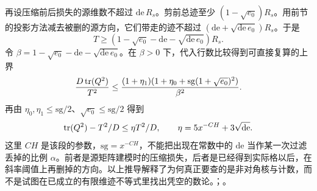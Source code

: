 再设压缩前后损失的源维数不超过 $\mathrm{de}\,R_s$。剪前总迹至少 $(1-\sqrt{e_0})R_s$。用前节的投影方法减去被删的源方向，它们带走的迹不超过 $(\mathrm{de}+\sqrt{\mathrm{de}\,e_0})R_s$。于是
\[
   T\ge(1-\sqrt{e_0}-\mathrm{de}
                   -\sqrt{\mathrm{de}\,e_0})R_s.
\]
令 $\beta=1-\sqrt{e_0}-\mathrm{de}-\sqrt{\mathrm{de}\,e_0}$。在 $\beta>0$ 下，代入行数比较得到可直接复算的上界
\[
 \frac{D\operatorname{tr}(Q^2)}{T^2}
 \le\frac{(1+\eta_1)
       (1+\eta_0+\mathrm{sg}(1+\sqrt{e_0})^2)}{\beta^2}.
\]
再由 $\eta_0,\eta_1\le\mathrm{sg}/2$、$\sqrt{e_0}\le\mathrm{sg}/2$ 得到
\[
 \operatorname{tr}(Q^2)-T^2/D\le\eta T^2/D,\qquad
 \eta=5x^{-CH}+3\sqrt{\mathrm{de}} .
\]
这里 $CH$ 是该段的参数，$\mathrm{sg}=x^{-CH}$，不能把出现在常数中的 $\mathrm{de}$ 当作某一次过滤丢掉的比例 $\alpha$。前者是源矩阵建模时的压缩损失，后者是已经得到实际格以后，在斜率阈值上再删掉的方向。以上推导解释了为何真正要查的是非对角核与计数，而不是试图在已成立的有限维迹不等式里找出凭空的数论。；。
